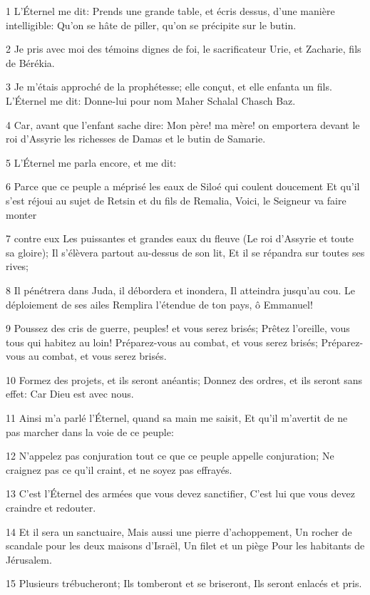 \par 1 L'Éternel me dit: Prends une grande table, et écris dessus, d'une manière intelligible: Qu'on se hâte de piller, qu'on se précipite sur le butin.
\par 2 Je pris avec moi des témoins dignes de foi, le sacrificateur Urie, et Zacharie, fils de Bérékia.
\par 3 Je m'étais approché de la prophétesse; elle conçut, et elle enfanta un fils. L'Éternel me dit: Donne-lui pour nom Maher Schalal Chasch Baz.
\par 4 Car, avant que l'enfant sache dire: Mon père! ma mère! on emportera devant le roi d'Assyrie les richesses de Damas et le butin de Samarie.
\par 5 L'Éternel me parla encore, et me dit:
\par 6 Parce que ce peuple a méprisé les eaux de Siloé qui coulent doucement Et qu'il s'est réjoui au sujet de Retsin et du fils de Remalia, Voici, le Seigneur va faire monter
\par 7 contre eux Les puissantes et grandes eaux du fleuve (Le roi d'Assyrie et toute sa gloire); Il s'élèvera partout au-dessus de son lit, Et il se répandra sur toutes ses rives;
\par 8 Il pénétrera dans Juda, il débordera et inondera, Il atteindra jusqu'au cou. Le déploiement de ses ailes Remplira l'étendue de ton pays, ô Emmanuel!
\par 9 Poussez des cris de guerre, peuples! et vous serez brisés; Prêtez l'oreille, vous tous qui habitez au loin! Préparez-vous au combat, et vous serez brisés; Préparez-vous au combat, et vous serez brisés.
\par 10 Formez des projets, et ils seront anéantis; Donnez des ordres, et ils seront sans effet: Car Dieu est avec nous.
\par 11 Ainsi m'a parlé l'Éternel, quand sa main me saisit, Et qu'il m'avertit de ne pas marcher dans la voie de ce peuple:
\par 12 N'appelez pas conjuration tout ce que ce peuple appelle conjuration; Ne craignez pas ce qu'il craint, et ne soyez pas effrayés.
\par 13 C'est l'Éternel des armées que vous devez sanctifier, C'est lui que vous devez craindre et redouter.
\par 14 Et il sera un sanctuaire, Mais aussi une pierre d'achoppement, Un rocher de scandale pour les deux maisons d'Israël, Un filet et un piège Pour les habitants de Jérusalem.
\par 15 Plusieurs trébucheront; Ils tomberont et se briseront, Ils seront enlacés et pris.

